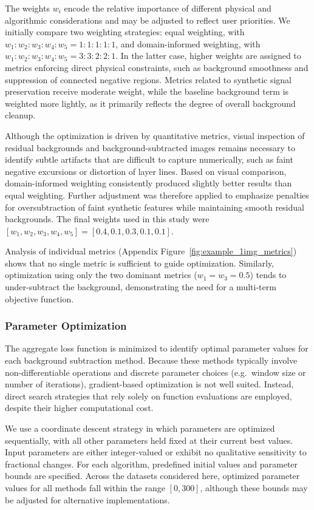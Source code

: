 \documentclass[iucr,review]{iucrjournals}
\begin{document}
The weights $w_i$ encode the relative importance of different physical and algorithmic considerations and may be adjusted to reflect user priorities. We initially compare two weighting strategies: equal weighting, with $w_1 : w_2 : w_3 : w_4 : w_5 = 1 : 1 : 1 : 1 : 1$, and domain-informed weighting, with $w_1 : w_2 : w_3 : w_4 : w_5 = 3 : 3 : 2 : 2 : 1$. In the latter case, higher weights are assigned to metrics enforcing direct physical constraints, such as background smoothness and suppression of connected negative regions. Metrics related to synthetic signal preservation receive moderate weight, while the baseline background term is weighted more lightly, as it primarily reflects the degree of overall background cleanup.

Although the optimization is driven by quantitative metrics, visual inspection of residual backgrounds and background-subtracted images remains necessary to identify subtle artifacts that are difficult to capture numerically, such as faint negative excursions or distortion of layer lines. Based on visual comparison, domain-informed weighting consistently produced slightly better results than equal weighting. Further adjustment was therefore applied to emphasize penalties for oversubtraction of faint synthetic features while maintaining smooth residual backgrounds. The final weights used in this study were $[w_1, w_2, w_3, w_4, w_5] = [0.4, 0.1, 0.3, 0.1, 0.1]$.

Analysis of individual metrics (Appendix Figure~\ref{fig:example_1img_metrics}) shows that no single metric is sufficient to guide optimization. Similarly, optimization using only the two dominant metrics ($w_1 = w_3 = 0.5$) tends to under-subtract the background, demonstrating the need for a multi-term objective function.


\subsubsection{Parameter Optimization}

The aggregate loss function is minimized to identify optimal parameter values for each background subtraction method. Because these methods typically involve non-differentiable operations and discrete parameter choices (e.g.\ window size or number of iterations), gradient-based optimization is not well suited. Instead, direct search strategies that rely solely on function evaluations are employed, despite their higher computational cost.

We use a coordinate descent strategy in which parameters are optimized sequentially, with all other parameters held fixed at their current best values. Input parameters are either integer-valued or exhibit no qualitative sensitivity to fractional changes. For each algorithm, predefined initial values and parameter bounds are specified. Across the datasets considered here, optimized parameter values for all methods fall within the range $[0, 300]$, although these bounds may be adjusted for alternative implementations.
\end{document}
